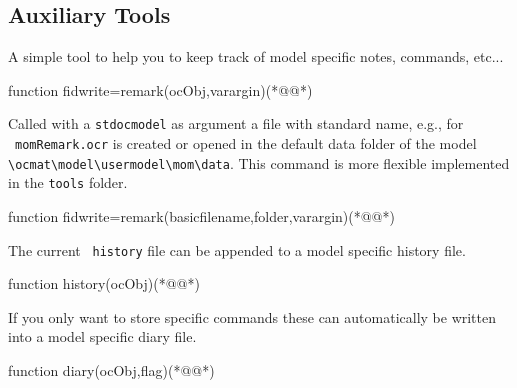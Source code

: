 \subsection{Auxiliary Tools}
A simple tool to help you to keep track of model specific notes, commands, etc...
\begin{matlab}
function fidwrite=remark(ocObj,varargin)(*@@*)
%
%
\end{matlab}
Called with a \lstinline+stdocmodel+ as argument a file with standard name, e.g., for \MoM\ \lstinline+momRemark.ocr+ is created or opened in the default data folder of the model \lstinline+\ocmat\model\usermodel\mom\data+. This command is more flexible implemented in the \lstinline+tools+ folder.
\begin{matlab}
function fidwrite=remark(basicfilename,folder,varargin)(*@@*)
%
%
%
%
%
\end{matlab}
The current \MATL\ \lstinline+history+ file can be appended to a model specific history file.
\begin{matlab}
function history(ocObj)(*@@*)
%
%
%
\end{matlab}
If you only want to store specific commands these can automatically be written into a model specific diary file.
\begin{matlab}
function diary(ocObj,flag)(*@@*)
%
%
\end{matlab} 
